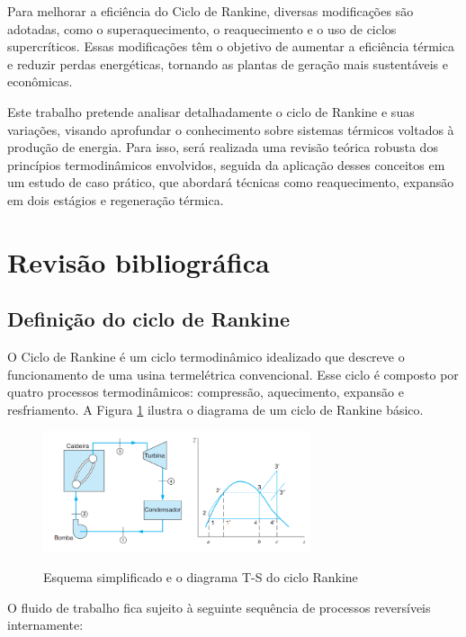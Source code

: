 \documentclass[
	article,			%
	11pt,				%
	oneside,			%
	a4paper,			%
	english,			%
	brazil,				%
	sumario=tradicional
	]{abntex2}
\begin{document}
Para melhorar a eficiência do Ciclo de Rankine, diversas modificações são adotadas, como o superaquecimento, o reaquecimento e o uso de ciclos supercríticos. Essas modificações têm o objetivo de aumentar a eficiência térmica e reduzir perdas energéticas, tornando as plantas de geração mais sustentáveis e econômicas.

Este trabalho pretende analisar detalhadamente o ciclo de Rankine e suas variações, visando aprofundar o conhecimento sobre sistemas térmicos voltados à produção de energia. Para isso, será realizada uma revisão teórica robusta dos princípios termodinâmicos envolvidos, seguida da aplicação desses conceitos em um estudo de caso prático, que abordará técnicas como reaquecimento, expansão em dois estágios e regeneração térmica.

\section{Revisão bibliográfica}

\subsection{Definição do ciclo de Rankine}

O Ciclo de Rankine é um ciclo termodinâmico idealizado que descreve o funcionamento de uma usina termelétrica convencional. Esse ciclo é composto por quatro processos termodinâmicos: compressão, aquecimento, expansão e resfriamento. A Figura \ref{fig:esquema-simplificado-ciclo-rankine} ilustra o diagrama de um ciclo de Rankine básico.

\begin{figure}[h]
	\centering
	\caption{Esquema simplificado e o diagrama T-S do ciclo Rankine}
	\includegraphics[width=0.7\textwidth]{./images/Esquema simplificado e o diagrama T-S do ciclo Rankine.png}
	\label{fig:esquema-simplificado-ciclo-rankine}
\end{figure}

O fluido de trabalho fica sujeito à seguinte sequência de processos reversíveis internamente: \cite{borgnakke-2020}
\end{document}
